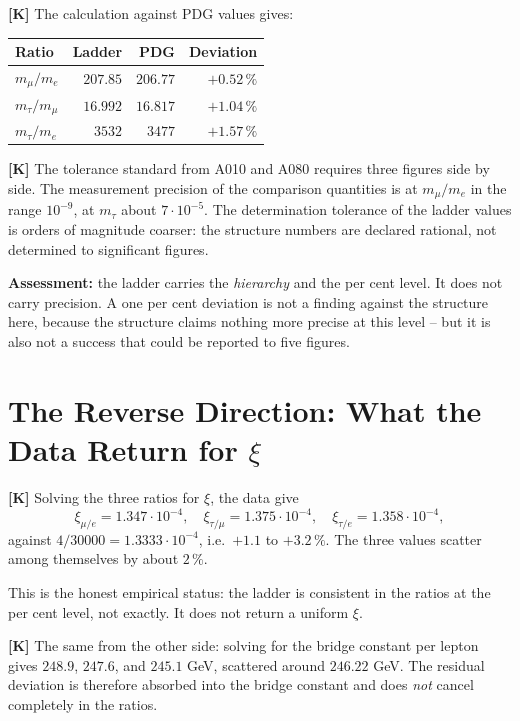 \textbf{[K]} The calculation against PDG values gives:

\begin{center}
\begin{tabular}{lrrr}
\hline
Ratio & Ladder & PDG & Deviation \\
\hline
$m_\mu/m_e$    & $207{.}85$ & $206{.}77$ & $+0{.}52\,\%$ \\
$m_\tau/m_\mu$ & $16{.}992$ & $16{.}817$ & $+1{.}04\,\%$ \\
$m_\tau/m_e$   & $3532$     & $3477$     & $+1{.}57\,\%$ \\
\hline
\end{tabular}
\end{center}

\textbf{[K]} The tolerance standard from A010 and A080 requires three figures
side by side. The measurement precision of the comparison quantities is at
$m_\mu/m_e$ in the range $10^{-9}$, at $m_\tau$ about $7\cdot10^{-5}$. The
determination tolerance of the ladder values is orders of magnitude coarser: the
structure numbers are declared rational, not determined to significant figures.

\textbf{Assessment:} the ladder carries the \emph{hierarchy} and the per cent
level. It does not carry precision. A one per cent deviation is not a finding
against the structure here, because the structure claims nothing more precise at
this level -- but it is also not a success that could be reported to five figures.

\section{The Reverse Direction: What the Data Return for $\xi$}

\textbf{[K]} Solving the three ratios for $\xi$, the data give
\[
  \xi_{\mu/e} = 1{.}347\cdot10^{-4},\quad
  \xi_{\tau/\mu} = 1{.}375\cdot10^{-4},\quad
  \xi_{\tau/e} = 1{.}358\cdot10^{-4},
\]
against $4/30000 = 1{.}3333\cdot10^{-4}$, i.e.\ $+1{.}1$ to $+3{.}2\,\%$.
The three values scatter among themselves by about $2\,\%$.

This is the honest empirical status: the ladder is consistent in the ratios at
the per cent level, not exactly. It does not return a uniform $\xi$.

\textbf{[K]} The same from the other side: solving for the bridge constant per
lepton gives $248{.}9$, $247{.}6$, and $245{.}1$ GeV, scattered around
$246{.}22$ GeV. The residual deviation is therefore absorbed into the bridge
constant and does \emph{not} cancel completely in the ratios.

